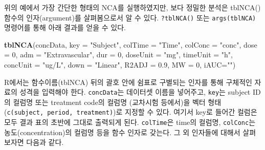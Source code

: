\documentclass[
  11pt,
  krantz2, a4paper, twoside]{krantz}
\newenvironment{Shaded}{\begin{snugshade}}{\end{snugshade}}
\newcommand{\AttributeTok}[1]{\textcolor[rgb]{0.13,0.29,0.53}{#1}}
\newcommand{\DecValTok}[1]{\textcolor[rgb]{0.00,0.00,0.81}{#1}}
\newcommand{\FloatTok}[1]{\textcolor[rgb]{0.00,0.00,0.81}{#1}}
\newcommand{\FunctionTok}[1]{\textcolor[rgb]{0.13,0.29,0.53}{\textbf{#1}}}
\newcommand{\NormalTok}[1]{#1}
\newcommand{\StringTok}[1]{\textcolor[rgb]{0.31,0.60,0.02}{#1}}
\theoremstyle{definition}
\theoremstyle{definition}
\theoremstyle{definition}
\theoremstyle{definition}
\theoremstyle{remark}
\begin{document}
위의 예에서 가장 간단한 형태의 NCA를 실행하였지만, 보다 정밀한 분석은 tblNCA() 함수의 인자(argument)를 살펴봄으로서 알 수 있다. \texttt{?tblNCA()} 또는 \texttt{args(tblNCA)} 명령어를 통해 아래 결과를 얻을 수 있다.

\begin{Shaded}
\begin{Highlighting}[]
\FunctionTok{tblNCA}\NormalTok{(concData, }\AttributeTok{key =} \StringTok{"Subject"}\NormalTok{, }\AttributeTok{colTime =} \StringTok{"Time"}\NormalTok{, }\AttributeTok{colConc =} \StringTok{"conc"}\NormalTok{, }
       \AttributeTok{dose =} \DecValTok{0}\NormalTok{, }\AttributeTok{adm =} \StringTok{"Extravascular"}\NormalTok{, }\AttributeTok{dur =} \DecValTok{0}\NormalTok{, }\AttributeTok{doseUnit =} \StringTok{"mg"}\NormalTok{, }
       \AttributeTok{timeUnit =} \StringTok{"h"}\NormalTok{, }\AttributeTok{concUnit =} \StringTok{"ug/L"}\NormalTok{, }\AttributeTok{down =} \StringTok{"Linear"}\NormalTok{, }\AttributeTok{R2ADJ =} \FloatTok{0.9}\NormalTok{, }
       \AttributeTok{MW =} \DecValTok{0}\NormalTok{, }\AttributeTok{iAUC=}\StringTok{""}\NormalTok{)}
\end{Highlighting}
\end{Shaded}

R에서는 함수이름(tblNCA) 뒤의 괄호 안에 쉼표로 구별되는 인자를 통해 구체적인 자료의 성격을 입력해야 한다.
\texttt{concData}는 데이터셋 이름을 넣어주고, \texttt{key}는 subject ID의 컬럼명 또는 treatment code의 컬럼명 (교차시험 등에서)을 벡터 형태(\texttt{c(\textquotesingle{}subject\textquotesingle{},\ \textquotesingle{}period\textquotesingle{},\ \textquotesingle{}treatment\textquotesingle{})})로 지정할 수 있다. 여기서 key로 들어간 컬럼은 모두 결과 표의 초반에 그대로 출력되게 된다.
\texttt{colTime}은 time의 컬럼명, \texttt{colConc}는 농도(concentration)의 컬럼명 등을 함수 인자로 갖는다. 그 외 인자들에 대해서 살펴보자면 다음과 같다.
\end{document}

